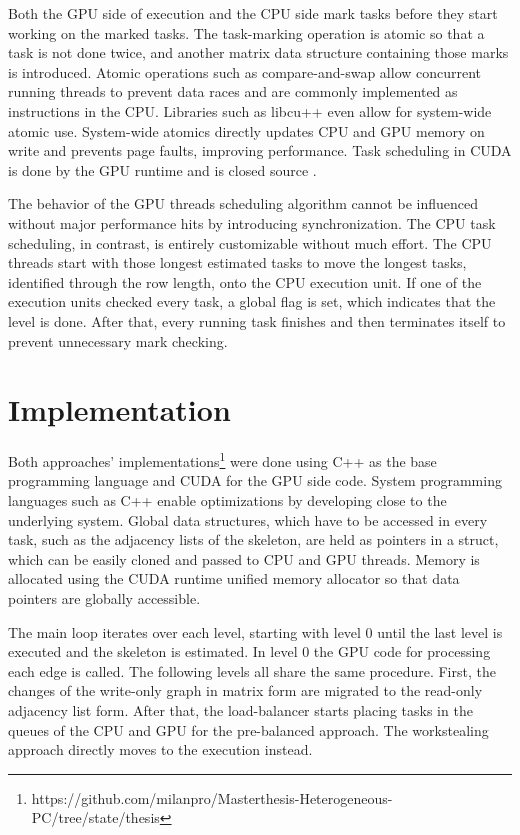 Both the GPU side of execution and the CPU side mark tasks before they start working on the marked tasks. The task-marking operation is atomic so that a task is not done twice, and another matrix data structure containing those marks is introduced. Atomic operations such as compare-and-swap allow concurrent running threads to prevent data races and are commonly implemented as instructions in the CPU.
Libraries such as libcu++ \cite{NVIDIALibcudacxx2021} even allow for system-wide atomic use. System-wide atomics directly updates CPU and GPU memory on write and prevents page faults, improving performance.
Task scheduling in CUDA is done by the GPU runtime and is closed source \cite{olmedoDissectingCUDAScheduling2020}.

The behavior of the GPU threads scheduling algorithm cannot be influenced without major performance hits by introducing synchronization. The CPU task scheduling, in contrast, is entirely customizable without much effort. The CPU threads start with those longest estimated tasks to move the longest tasks, identified through the row length, onto the CPU execution unit.
If one of the execution units checked every task, a global flag is set, which indicates that the level is done. After that, every running task finishes and then terminates itself to prevent unnecessary mark checking.


\section{Implementation}
Both approaches' implementations\footnote{https://github.com/milanpro/Masterthesis-Heterogeneous-PC/tree/state/thesis} were done using C++ as the base programming language and CUDA for the GPU side code. System programming languages such as C++ enable optimizations by developing close to the underlying system. Global data structures, which have to be accessed in every task, such as the adjacency lists of the skeleton, are held as pointers in a struct, which can be easily cloned and passed to CPU and GPU threads. Memory is allocated using the CUDA runtime unified memory allocator so that data pointers are globally accessible.

The main loop iterates over each level, starting with level 0 until the last level is executed and the skeleton is estimated. In level 0 the GPU code for processing each edge is called. The following levels all share the same procedure. First, the changes of the write-only graph in matrix form are migrated to the read-only adjacency list form. After that, the load-balancer starts placing tasks in the queues of the CPU and GPU for the pre-balanced approach. The workstealing approach directly moves to the execution instead.

